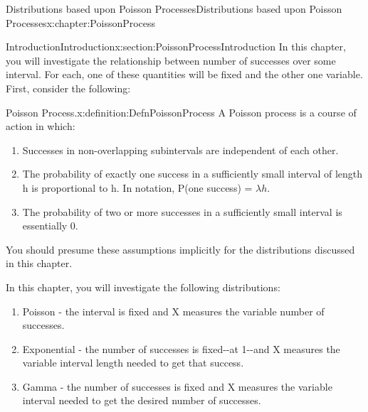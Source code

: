 \documentclass[oneside,10pt,]{book}
\numberwithin{equation}{section}
\begin{document}
\begin{chapterptx}{Distributions based upon Poisson Processes}{}{Distributions based upon Poisson Processes}{}{}{x:chapter:PoissonProcess}
%
%
\typeout{************************************************}
\typeout{************************************************}
%
\begin{sectionptx}{Introduction}{}{Introduction}{}{}{x:section:PoissonProcessIntroduction}
In this chapter, you will investigate the relationship between number of successes over some interval.  For each, one of these quantities will be fixed and the other one variable. First, consider the following:%
\par
\begin{definition}{Poisson Process.}{x:definition:DefnPoissonProcess}%
A Poisson process is a course of action in which:%
\begin{enumerate}
\item{}Successes in non-overlapping subintervals are independent of each other.%
\item{}The probability of exactly one success in a sufficiently small interval of length h is proportional to h.  In notation, P(one success) = \(\lambda h\).%
\item{}The probability of two or more successes in a sufficiently small interval is essentially 0.%
\end{enumerate}
%
\end{definition}
%
\par
You should presume these assumptions implicitly for the distributions discussed in this chapter.%
\par
In this chapter, you will investigate the following distributions:%
\begin{enumerate}
\item{}Poisson - the interval is fixed and X measures the variable number of successes.%
\item{}Exponential - the number of successes is fixed-{}-{}at 1-{}-{}and X measures the variable interval length needed to get that success.%
\item{}Gamma - the number of successes is fixed and X measures the variable interval needed to get the desired number of successes.%
\end{enumerate}
%
\end{sectionptx}
%
%
\typeout{************************************************}
\typeout{************************************************}

\end{chapterptx}
\end{document}
